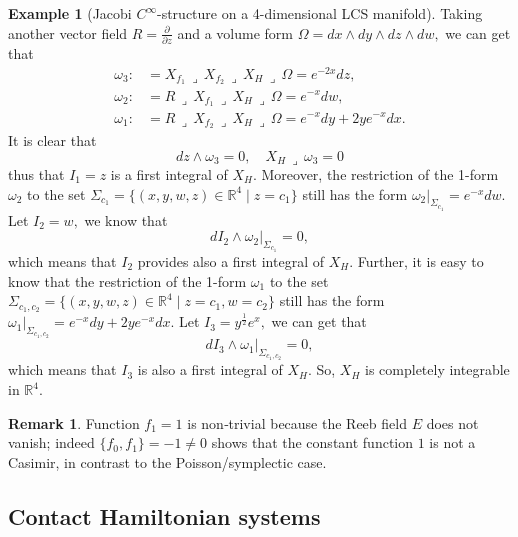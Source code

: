 \documentclass{article}
\theoremstyle{remark}
\theoremstyle{definition}
\newtheorem{remark}{Remark}[section]
\newtheorem{example}{Example}[section]
\newcommand{\contract}{\,\lrcorner\,}
\begin{document}
\begin{example}[Jacobi $C^\infty$-structure on a 4-dimensional LCS manifold]
Taking another vector field $R=\frac{\partial}{\partial z}$ and a volume form $\Omega=dx\wedge dy\wedge dz\wedge dw,$ we can get that
\begin{align*}
\omega_3:&=X_{f_1}\contract X_{f_2}\contract X_H\contract\Omega=e^{-2x}dz, \\ \omega_2:&=R\contract X_{f_1}\contract X_H\contract\Omega=e^{-x}dw,\\
\omega_1:&=R\contract X_{f_2}\contract X_H\contract\Omega=e^{-x}dy+2ye^{-x}dx.
\end{align*}
It is clear that 
$$dz\wedge\omega_3=0,\quad X_H\contract\omega_3=0$$
thus that $I_1=z$ is a first integral of $X_H.$ Moreover, the restriction of the 1-form $\omega_2$ to the set $\Sigma_{c_1}=\{(x,y,w,z)\in\mathbb R^4\;|\;z=c_1\}$ still has the form $\omega_2|_{\Sigma_{c_1}}=e^{-x}dw$. Let $I_2=w,$ we know that 
$$dI_2\wedge\omega_2|_{\Sigma_{c_1}}=0, $$
which means that $I_2$ provides also a first integral of $X_H.$ Further, it is easy to know that the restriction of the 1-form $\omega_1$ to the set $\Sigma_{c_1,c_2}=\{(x,y,w,z)\in\mathbb R^4\;|\;z=c_1,w=c_2\}$ still has the form $\omega_1|_{\Sigma_{c_1,c_2}}=e^{-x}dy+2ye^{-x}dx$. Let $I_3=y^{\frac{1}{2}}e^x,$ we can get that 
$$dI_3\wedge\omega_1|_{\Sigma_{c_1, c_2}}=0, $$
which means that $I_3$ is also a first integral of $X_H.$ So, $X_H$ is completely integrable in $\mathbb R^4.$
\begin{remark}
 Function $f_1=1$ is non‑trivial because the Reeb field $E$ does not vanish; indeed $\{f_0,f_1\}=-1\neq0$ shows that the constant function $1$ is not a Casimir, in contrast to the Poisson/symplectic case.
\end{remark}


\end{example}




\subsection{Contact Hamiltonian systems}
\end{document}
